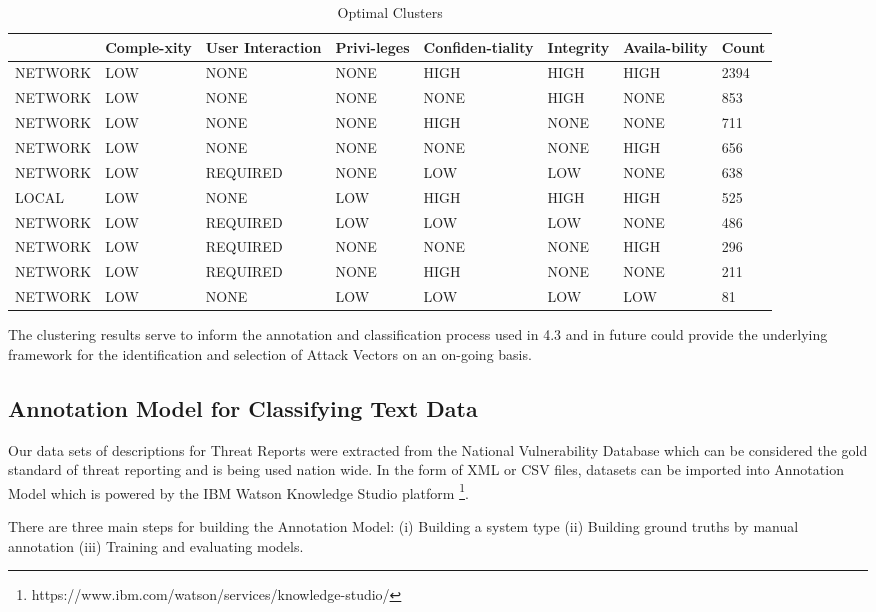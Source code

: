 \documentclass{article} %
\begin{document}
\begin{table}[h!]
\begin{center}
\begin{tabular}{ |l|p{1.3cm}|l|p{1.1cm}|p{1.4cm}|p{1.1cm}|p{1.4cm}|p{1.1cm}| } \hline
\small{Attack Vector & Comple-xity & User Interaction & Privi-leges & Confiden-tiality & Integrity & Availa-bility & Count} \\ \hline
NETWORK & LOW & NONE & NONE & HIGH & HIGH & HIGH & 2394 \\
NETWORK & LOW & NONE & NONE & NONE & HIGH & NONE & 853 \\
NETWORK & LOW & NONE & NONE & HIGH & NONE & NONE & 711 \\
NETWORK & LOW & NONE & NONE & NONE & NONE & HIGH & 656 \\
NETWORK & LOW & REQUIRED & NONE & LOW & LOW & NONE & 638 \\ 
LOCAL & LOW & NONE & LOW & HIGH & HIGH & HIGH & 525 \\
NETWORK & LOW & REQUIRED & LOW & LOW & LOW & NONE & 486 \\
NETWORK & LOW & REQUIRED & NONE & NONE & NONE & HIGH & 296 \\
NETWORK & LOW & REQUIRED & NONE & HIGH & NONE & NONE & 211 \\
NETWORK & LOW & NONE & LOW & LOW & LOW & LOW & 81 \\
\hline
\end{tabular}
\caption{Optimal Clusters}
\end{center}
\label{table:1}
\end{table}

The clustering results serve to inform the annotation and classification process used in 4.3 and in future could provide the underlying framework for the identification and selection of Attack Vectors on an on-going basis.


\subsection{Annotation Model for Classifying Text Data}
Our data sets of descriptions for Threat Reports were extracted from the National Vulnerability Database which can be considered the gold standard of threat reporting and is being used nation wide. In the form of XML or CSV files, datasets can be imported into Annotation Model which is powered by the IBM Watson Knowledge Studio platform \footnote{https://www.ibm.com/watson/services/knowledge-studio/}.

There are three main steps for building the Annotation Model: (i) Building a system type (ii) Building ground truths by manual annotation (iii) Training and evaluating models.
\end{document}
